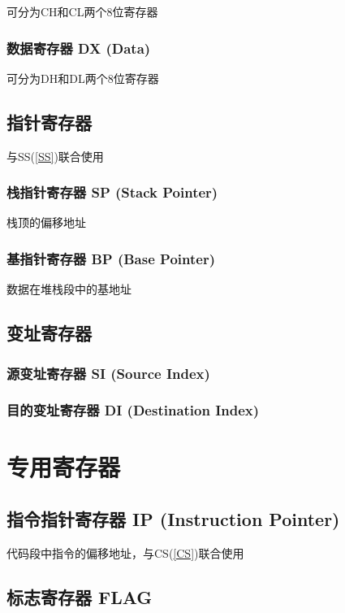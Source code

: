 \documentclass{article}
\begin{document}
可分为CH和CL两个8位寄存器


\subsubsection{数据寄存器 DX (Data)}

可分为DH和DL两个8位寄存器


\subsection{指针寄存器\label{Pointer}}

与SS(\ref{SS})联合使用

\subsubsection{栈指针寄存器 SP (Stack Pointer)}

栈顶的偏移地址

\subsubsection{基指针寄存器 BP (Base Pointer)}

数据在堆栈段中的基地址

\subsection{变址寄存器}

\subsubsection{源变址寄存器 SI (Source Index)}

\subsubsection{目的变址寄存器 DI (Destination Index)}

\section{专用寄存器}

\subsection{指令指针寄存器 IP (Instruction Pointer)\label{IP}}

代码段中指令的偏移地址，与CS(\ref{CS})联合使用

\subsection{标志寄存器 FLAG}
\end{document}
